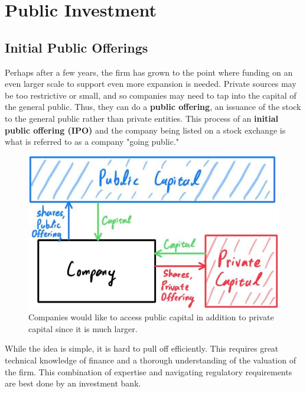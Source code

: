 \documentclass{article}
\begin{document}
\section{Public Investment}

  \subsection{Initial Public Offerings}

    Perhaps after a few years, the firm has grown to the point where funding on an even larger scale to support even more expansion is needed. Private sources may be too restrictive or small, and so companies may need to tap into the capital of the general public. Thus, they can do a \textbf{public offering}, an issuance of the stock to the general public rather than private entities. This process of an \textbf{initial public offering (IPO)} and the company being listed on a stock exchange is what is referred to as a company "going public." 

    \begin{figure}[H]
      \centering 
      \includegraphics[scale=0.27]{img/Going_public.jpg}
      \caption{Companies would like to access public capital in addition to private capital since it is much larger. } 
      \label{fig:going_public}
    \end{figure}

    While the idea is simple, it is hard to pull off efficiently. This requires great technical knowledge of finance and a thorough understanding of the valuation of the firm. This combination of expertise and navigating regulatory requirements are best done by an investment bank. 
\end{document}
